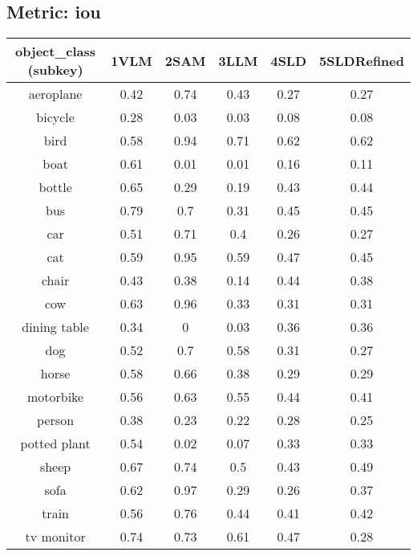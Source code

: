 \subsection*{Metric: iou}
\begin{center}
    \begin{tabular}{cccccc}
        \toprule
        object\_class (subkey) & 1VLM & 2SAM & 3LLM & 4SLD & 5SLDRefined \\
        \midrule
        aeroplane & 0.42 & 0.74 & 0.43 & 0.27 & 0.27 \\
        bicycle & 0.28 & 0.03 & 0.03 & 0.08 & 0.08 \\
        bird & 0.58 & 0.94 & 0.71 & 0.62 & 0.62 \\
        boat & 0.61 & 0.01 & 0.01 & 0.16 & 0.11 \\
        bottle & 0.65 & 0.29 & 0.19 & 0.43 & 0.44 \\
        bus & 0.79 & 0.7 & 0.31 & 0.45 & 0.45 \\
        car & 0.51 & 0.71 & 0.4 & 0.26 & 0.27 \\
        cat & 0.59 & 0.95 & 0.59 & 0.47 & 0.45 \\
        chair & 0.43 & 0.38 & 0.14 & 0.44 & 0.38 \\
        cow & 0.63 & 0.96 & 0.33 & 0.31 & 0.31 \\
        dining table & 0.34 & 0 & 0.03 & 0.36 & 0.36 \\
        dog & 0.52 & 0.7 & 0.58 & 0.31 & 0.27 \\
        horse & 0.58 & 0.66 & 0.38 & 0.29 & 0.29 \\
        motorbike & 0.56 & 0.63 & 0.55 & 0.44 & 0.41 \\
        person & 0.38 & 0.23 & 0.22 & 0.28 & 0.25 \\
        potted plant & 0.54 & 0.02 & 0.07 & 0.33 & 0.33 \\
        sheep & 0.67 & 0.74 & 0.5 & 0.43 & 0.49 \\
        sofa & 0.62 & 0.97 & 0.29 & 0.26 & 0.37 \\
        train & 0.56 & 0.76 & 0.44 & 0.41 & 0.42 \\
        tv monitor & 0.74 & 0.73 & 0.61 & 0.47 & 0.28 \\
        \bottomrule
    \end{tabular}
\end{center}

